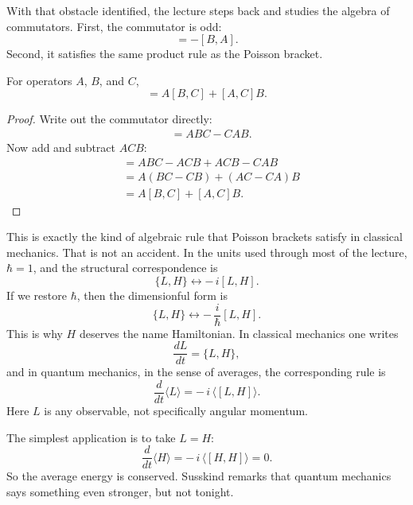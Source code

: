 With that obstacle identified, the lecture steps back and studies the algebra of commutators. First, the commutator is odd:
\begin{equation}
[A,B]=-[B,A].
\end{equation}
Second, it satisfies the same product rule as the Poisson bracket.

\begin{proposition}
For operators \(A\), \(B\), and \(C\),
\begin{equation}
[AB,C]=A[B,C]+[A,C]B.
\end{equation}
\end{proposition}

\begin{proof}
Write out the commutator directly:
\begin{align}
[AB,C]
&=ABC-CAB.
\end{align}
Now add and subtract \(ACB\):
\begin{align}
[AB,C]
&=ABC-ACB+ACB-CAB \\
&=A(BC-CB)+(AC-CA)B \\
&=A[B,C]+[A,C]B.
\end{align}
\end{proof}

This is exactly the kind of algebraic rule that Poisson brackets satisfy in classical mechanics. That is not an accident. In the units used through most of the lecture, \(\hbar=1\), and the structural correspondence is
\begin{equation}
\{L,H\}\leftrightarrow -\,i[L,H].
\end{equation}
If we restore \(\hbar\), then the dimensionful form is
\begin{equation}
\{L,H\}\leftrightarrow -\,\frac{i}{\hbar}[L,H].
\end{equation}
This is why \(H\) deserves the name Hamiltonian. In classical mechanics one writes
\begin{equation}
\frac{dL}{dt}=\{L,H\},
\end{equation}
and in quantum mechanics, in the sense of averages, the corresponding rule is
\begin{equation}
\frac{d}{dt}\langle L\rangle=-\,i\,\langle [L,H]\rangle.
\end{equation}
Here \(L\) is any observable, not specifically angular momentum.

The simplest application is to take \(L=H\):
\begin{equation}
\frac{d}{dt}\langle H\rangle = -\,i\,\langle [H,H]\rangle = 0.
\end{equation}
So the average energy is conserved. Susskind remarks that quantum mechanics says something even stronger, but not tonight.

